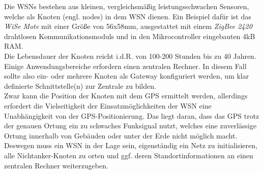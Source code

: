 \documentclass[12pt, a4wide]{scrreprt}
\begin{document}
Die WSNs bestehen aus kleinen, vergleichsmäßig leistungsschwachen Sensoren, welche als Knoten (engl. nodes) in dem WSN dienen. Ein Beispiel dafür ist das \textit{WiSe Mote} mit einer Größe von 56x58mm, ausgestattet mit einem \textit{ZigBee 2420} drahtlosen Kommunikationsmoduls und in den Mikrocontroller eingebauten 4kB RAM\cite{WiSe}.\\
\indent
Die Lebensdauer der Knoten reicht i.d.R. von 100-200 Stunden\cite{lifetime_study} bis zu 40 Jahren.\\
\indent
Einige Anwendungsbereiche erfordern einen zentralen Rechner. In diesem Fall sollte also ein- oder mehrere Knoten als Gateway konfiguriert werden, um klar definierte Schnittstelle(n) zur Zentrale zu bilden.\\
\indent
Zwar kann die Position der Knoten mit dem GPS ermittelt werden, allerdings erfordert die Vielseitigkeit der Einsatzmöglichkeiten der WSN eine Unabhängigkeit von der GPS-Positionierung. Das liegt daran, dass das GPS trotz der genauen Ortung ein zu schwaches Funksignal nutzt, welches eine zuverlässige  Ortung innerhalb von Gebäuden oder unter der Erde nicht möglich macht. Deswegen muss ein WSN in der Lage sein, eigenständig ein Netz zu initialisieren, alle Nichtanker-Knoten zu orten und ggf. deren Standortinformationen an einen zentralen Rechner weiterzugeben.

\end{document}

